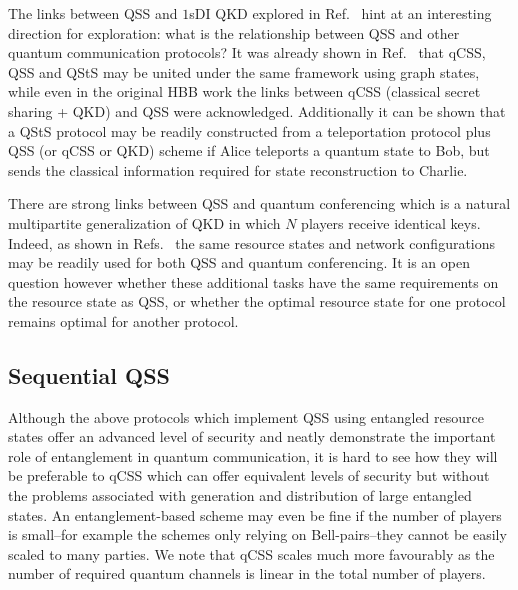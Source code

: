 The links between QSS and $1$sDI QKD explored in Ref.~\cite{Kogias2017} hint at an interesting direction for exploration: what is the relationship between QSS and other quantum communication protocols? It was already shown in Ref.~\cite{Markham2008a} that qCSS, QSS and QStS may be united under the same framework using graph states, while even in the original HBB work \cite{Hillery1999} the links between qCSS (classical secret sharing + QKD) and QSS were acknowledged. Additionally it can be shown  that a QStS protocol may be readily constructed from a teleportation protocol plus QSS (or qCSS or QKD) scheme if Alice teleports a quantum state to Bob, but sends the classical information required for state reconstruction to Charlie.

There are strong links between QSS and quantum conferencing \cite{Wu2016, Ottaviani2017b} which is a natural multipartite generalization of QKD in which $N$ players receive identical keys. Indeed, as shown in Refs.~\cite{Wu2016, Ottaviani2017b} the same resource states and network configurations may be readily used for both QSS and quantum conferencing. It is an open question however whether these additional tasks have the same requirements \cite{Kogias2017, Xiang2017} on the resource state as QSS, or whether the optimal resource state for one protocol remains optimal for another protocol. 





\subsection{Sequential QSS}
Although the above protocols which implement QSS using entangled resource states offer an advanced level of security and neatly demonstrate the important role of entanglement in quantum communication, it is hard to see how they will be preferable to qCSS which can offer equivalent levels of security but without the problems associated with generation and distribution of large entangled states. An entanglement-based scheme may even be fine if the number of players is small--for example the schemes \cite{Karlsson1999}  only relying on Bell-pairs--they cannot be easily scaled to many parties. We note that qCSS scales much more favourably as the number of required quantum channels is linear in the total number of players.

